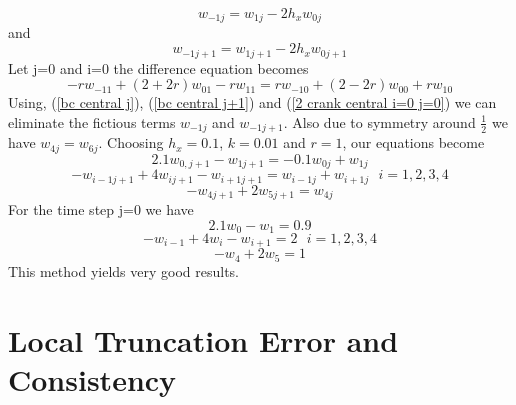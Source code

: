 \begin{example}
\begin{itemize}
\begin{equation}
\label{bc central j}
w_{-1j}=w_{1j}-2h_xw_{0j}
\end{equation}
and
\begin{equation}
\label{bc central j+1}
w_{-1j+1}=w_{1j+1}-2h_xw_{0j+1}
\end{equation}
Let j=0 and i=0 the difference equation becomes
\begin{equation}
\label{2 crank central i=0 j=0}
-rw_{-11}+(2+2r)w_{01}-rw_{11}
=
rw_{-10}+(2-2r)w_{00}+rw_{10}
\end{equation}
Using, (\ref{bc central j}), (\ref{bc central j+1}) and (\ref{2 crank central i=0 j=0}) we can eliminate the fictious terms $w_{-1j}$ and $w_{-1j+1}$.  Also due to symmetry
around $\frac{1}{2}$ we have $w_{4j}=w_{6j}$.  Choosing $h_x=0.1$, $k=0.01$ and $r=1$, our equations become
\[2.1w_{0,j+1}-w_{1j+1}=-0.1w_{0j}+w_{1j} \]
\[-w_{i-1j+1}+4w_{ij+1}-w_{i+1j+1} = w_{i-1j}+w_{i+1j} \ \ \ i=1,2,3,4\]
\[-w_{4j+1}+2w_{5j+1} = w_{4j}\]
For the time step j=0 we have 
\[2.1w_{0}-w_{1}=0.9 \]
\[-w_{i-1}+4w_{i}-w_{i+1} = 2 \ \ \ i=1,2,3,4\]
\[-w_{4}+2w_{5} = 1\]
This method yields very good results.
\end{itemize}
\end{example}
\section{Local Truncation Error and Consistency}
